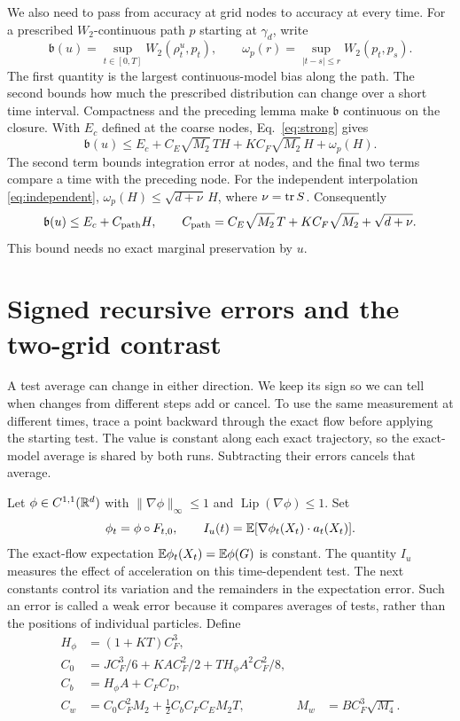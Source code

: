 We also need to pass from accuracy at grid nodes to accuracy at every time.
For a prescribed $W_2$-continuous path $p$ starting at $\gamma_d$, write
\[
 \mathfrak b(u)=\sup_{t\in[0,T]}W_2(\rho_t^u,p_t),\qquad
 \omega_p(r)=\sup_{|t-s|\le r}W_2(p_t,p_s).
\]
The first quantity is the largest continuous-model bias along the path.
The second bounds how much the prescribed distribution can change over a
short time interval. Compactness and the preceding lemma make $\mathfrak b$
continuous on the closure. With $E_c$ defined at the coarse nodes,
Eq.~\eqref{eq:strong} gives
\begin{equation}
 \mathfrak b(u)\le E_c+C_E\sqrt{M_2}\,TH+KC_F\sqrt{M_2}\,H+\omega_p(H).
 \label{eq:bias-general}
\end{equation}
The second term bounds integration error at nodes, and the final two terms
compare a time with the preceding node. For the independent interpolation
\eqref{eq:independent}, $\omega_p(H)\le\sqrt{d+\nu}\,H$, where
$\nu=\operatorname{tr} S$. Consequently
\begin{equation}
 \mathfrak b(u)\le E_c+C_{\rm path}H,\qquad
 C_{\rm path}=C_E\sqrt{M_2}\,T+KC_F\sqrt{M_2}+\sqrt{d+\nu}.
 \label{eq:bias-from-nodes}
\end{equation}
This bound needs no exact marginal preservation by $u$.

\section{Signed recursive errors and the two-grid contrast}
\label{app:contrast}

A test average can change in either direction. We keep its sign so we
can tell when changes from different steps add or cancel. To use the
same measurement at different times, trace a point backward through the
exact flow before applying the starting test. The value is constant
along each exact trajectory, so the exact-model average is shared by
both runs. Subtracting their errors cancels that average.\AIassistance

Let $\phi\in C^{1,1}(\mathbb R^d)$ with
$\|\nabla\phi\|_\infty\le1$ and $\operatorname{Lip}(\nabla\phi)\le1$.
Set
\begin{equation}
 \phi_t=\phi\circ F_{t,0},\qquad
 I_u(t)=\mathbb E[\nabla\phi_t(X_t)\cdot a_t(X_t)].
 \label{eq:I-def}
\end{equation}
The exact-flow expectation $\mathbb E\phi_t(X_t)=\mathbb E\phi(G)$ is constant.
The quantity $I_u$ measures the effect of acceleration on this time-dependent
test. The next constants control its variation and the remainders in the
expectation error. Such an error is called a weak error because it compares
averages of tests, rather than the positions of individual particles. Define
\begin{align}
 H_\phi&=(1+KT)C_F^3,\\
 C_0&=JC_F^3/6+KAC_F^2/2+TH_\phi A^2C_F^2/8,\\
 C_b&=H_\phi A+C_FC_D,\\
 C_w&=C_0C_F^2M_2+\tfrac12 C_bC_FC_EM_2T,
 & M_w&=BC_F^3\sqrt{M_4}.
 \label{eq:weak-constants}
\end{align}

